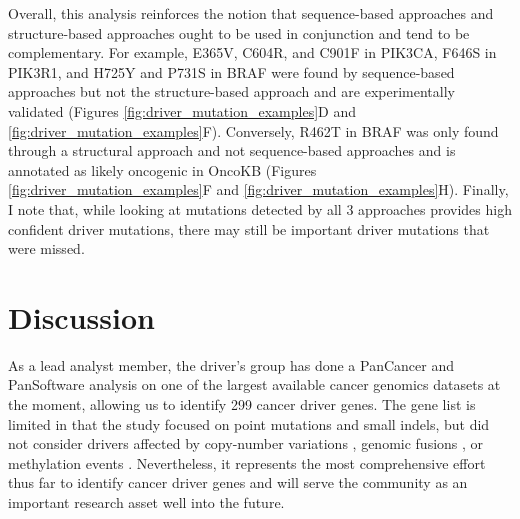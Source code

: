 Overall, this analysis reinforces the notion that sequence-based approaches and structure-based approaches ought to be used in conjunction and tend to be complementary. For example, E365V, C604R, and C901F in PIK3CA, F646S in PIK3R1, and H725Y and P731S in BRAF were found by sequence-based approaches but not the structure-based approach and are experimentally validated (Figures \ref{fig:driver_mutation_examples}D and \ref{fig:driver_mutation_examples}F). Conversely, R462T in BRAF was only found through a structural approach and not sequence-based approaches and is annotated as likely oncogenic in OncoKB (Figures \ref{fig:driver_mutation_examples}F and \ref{fig:driver_mutation_examples}H). Finally, I note that, while looking at mutations detected by all 3 approaches provides high confident driver mutations, there may still be important driver mutations that were missed. 

\section{Discussion}

As a lead analyst member, the driver's group has done a PanCancer and PanSoftware analysis on one of the largest available cancer genomics datasets at the moment, allowing us to identify 299 cancer driver genes. The gene list is limited in that the study focused on point mutations and small indels, but did not consider drivers affected by copy-number variations \cite{RN194}, genomic fusions \cite{RN195}, or methylation events \cite{RN196}. Nevertheless, it represents the most comprehensive effort thus far to identify cancer driver genes and will serve the community as an important research asset well into the future.

